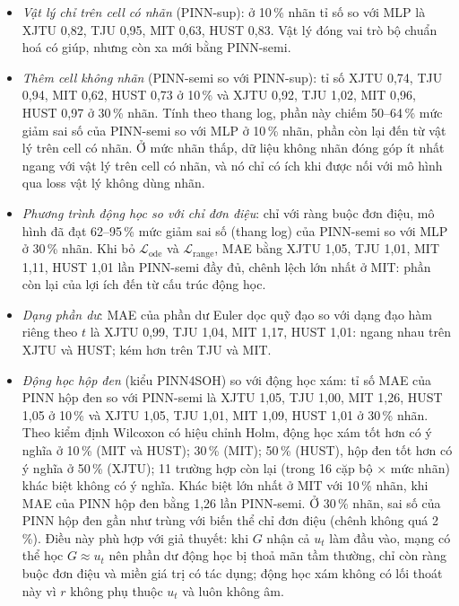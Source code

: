\documentclass[12pt,a4paper,oneside]{report}
\theoremstyle{plain}
\theoremstyle{definition}
\begin{document}
\begin{itemize}
\item \emph{Vật lý chỉ trên cell có nhãn} (PINN-sup): ở 10\,\% nhãn tỉ số so với MLP là XJTU 0{,}82, TJU 0{,}95, MIT 0{,}63, HUST 0{,}83. Vật lý đóng vai trò bộ chuẩn hoá có giúp, nhưng còn xa mới bằng PINN-semi.
\item \emph{Thêm cell không nhãn} (PINN-semi so với PINN-sup): tỉ số XJTU 0{,}74, TJU 0{,}94, MIT 0{,}62, HUST 0{,}73 ở 10\,\% và XJTU 0{,}92, TJU 1{,}02, MIT 0{,}96, HUST 0{,}97 ở 30\,\% nhãn. Tính theo thang log, phần này chiếm 50--64\,\% mức giảm sai số của PINN-semi so với MLP ở 10\,\% nhãn, phần còn lại đến từ vật lý trên cell có nhãn. Ở mức nhãn thấp, dữ liệu không nhãn đóng góp ít nhất ngang với vật lý trên cell có nhãn, và nó chỉ có ích khi được nối với mô hình qua loss vật lý không dùng nhãn.
\item \emph{Phương trình động học so với chỉ đơn điệu}: chỉ với ràng buộc đơn điệu, mô hình đã đạt 62--95\,\% mức giảm sai số (thang log) của PINN-semi so với MLP ở 30\,\% nhãn. Khi bỏ $\mathcal{L}_\text{ode}$ và $\mathcal{L}_\text{range}$, MAE bằng XJTU 1{,}05, TJU 1{,}01, MIT 1{,}11, HUST 1{,}01 lần PINN-semi đầy đủ, chênh lệch lớn nhất ở MIT: phần còn lại của lợi ích đến từ cấu trúc động học.
\item \emph{Dạng phần dư}: MAE của phần dư Euler dọc quỹ đạo so với dạng đạo hàm riêng theo $t$ là XJTU 0{,}99, TJU 1{,}04, MIT 1{,}17, HUST 1{,}01: ngang nhau trên XJTU và HUST; kém hơn trên TJU và MIT.
\item \emph{Động học hộp đen} (kiểu PINN4SOH) so với động học xám: tỉ số MAE của PINN hộp đen so với PINN-semi là XJTU 1{,}05, TJU 1{,}00, MIT 1{,}26, HUST 1{,}05 ở 10\,\% và XJTU 1{,}05, TJU 1{,}01, MIT 1{,}09, HUST 1{,}01 ở 30\,\% nhãn. Theo kiểm định Wilcoxon có hiệu chỉnh Holm, động học xám tốt hơn có ý nghĩa ở 10\,\% (MIT và HUST); 30\,\% (MIT); 50\,\% (HUST), hộp đen tốt hơn có ý nghĩa ở 50\,\% (XJTU); 11 trường hợp còn lại (trong 16 cặp bộ × mức nhãn) khác biệt không có ý nghĩa. Khác biệt lớn nhất ở MIT với 10\,\% nhãn, khi MAE của PINN hộp đen bằng 1{,}26 lần PINN-semi. Ở 30\,\% nhãn, sai số của PINN hộp đen gần như trùng với biến thể chỉ đơn điệu (chênh không quá 2\,\%). Điều này phù hợp với giả thuyết: khi $G$ nhận cả $u_t$ làm đầu vào, mạng có thể học $G \approx u_t$ nên phần dư động học bị thoả mãn tầm thường, chỉ còn ràng buộc đơn điệu và miền giá trị có tác dụng; động học xám không có lối thoát này vì $r$ không phụ thuộc $u_t$ và luôn không âm.
\end{itemize}
\end{document}
